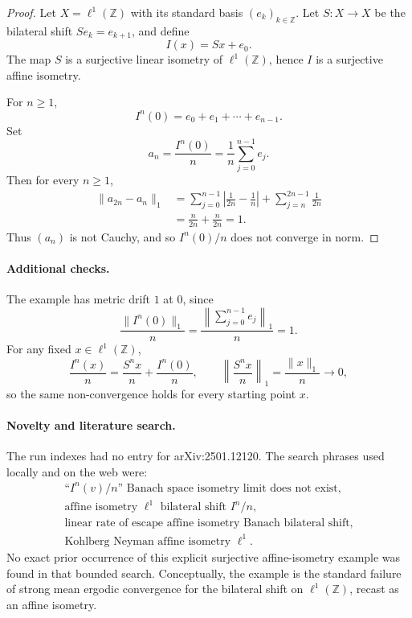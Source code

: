 \documentclass[11pt]{article}
\begin{document}
\begin{proof}
Let $X=\ell^1(\mathbb Z)$ with its standard basis $(e_k)_{k\in\mathbb Z}$.
Let $S:X\to X$ be the bilateral shift $S e_k=e_{k+1}$, and define
\[
  I(x)=Sx+e_0 .
\]
The map $S$ is a surjective linear isometry of $\ell^1(\mathbb Z)$, hence
$I$ is a surjective affine isometry.

For $n\geq 1$,
\[
  I^n(0)=e_0+e_1+\cdots+e_{n-1}.
\]
Set
\[
  a_n=\frac{I^n(0)}{n}
      =\frac{1}{n}\sum_{j=0}^{n-1}e_j .
\]
Then for every $n\geq 1$,
\[
\begin{aligned}
 \|a_{2n}-a_n\|_1
 &= \sum_{j=0}^{n-1}\left|\frac{1}{2n}-\frac{1}{n}\right|
    +\sum_{j=n}^{2n-1}\frac{1}{2n}  \\
 &= \frac{n}{2n}+\frac{n}{2n}=1 .
\end{aligned}
\]
Thus $(a_n)$ is not Cauchy, and so $I^n(0)/n$ does not converge in norm.
\end{proof}

\paragraph{Additional checks.}
The example has metric drift $1$ at $0$, since
\[
  \frac{\|I^n(0)\|_1}{n}
  =\frac{\left\|\sum_{j=0}^{n-1}e_j\right\|_1}{n}=1.
\]
For any fixed $x\in\ell^1(\mathbb Z)$,
\[
  \frac{I^n(x)}{n}
  =\frac{S^n x}{n}+\frac{I^n(0)}{n},
  \qquad
  \left\|\frac{S^n x}{n}\right\|_1=\frac{\|x\|_1}{n}\to 0,
\]
so the same non-convergence holds for every starting point $x$.

\paragraph{Novelty and literature search.}
The run indexes had no entry for arXiv:2501.12120.  The search phrases used
locally and on the web were:
\[
\begin{gathered}
\text{``}I^n(v)/n\text{'' Banach space isometry limit does not exist},\\
\text{affine isometry } \ell^1 \text{ bilateral shift } I^n/n,\\
\text{linear rate of escape affine isometry Banach bilateral shift},\\
\text{Kohlberg Neyman affine isometry } \ell^1 .
\end{gathered}
\]
No exact prior occurrence of this explicit surjective affine-isometry example
was found in that bounded search.  Conceptually, the example is the standard
failure of strong mean ergodic convergence for the bilateral shift on
$\ell^1(\mathbb Z)$, recast as an affine isometry.
\end{document}
